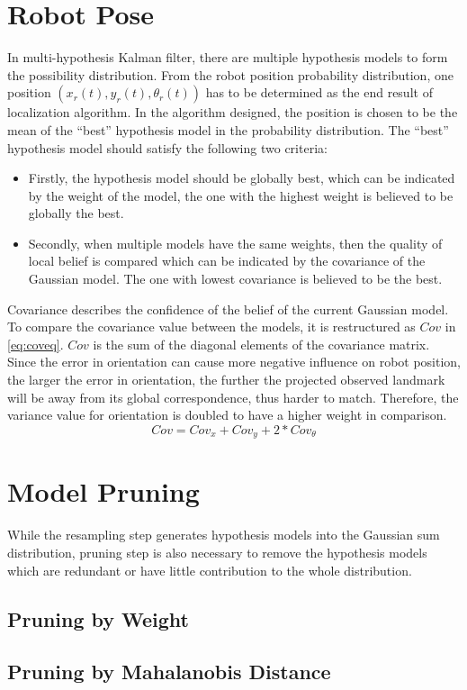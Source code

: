 \section{Robot Pose}
In multi-hypothesis Kalman filter, there are multiple hypothesis models to form the possibility distribution. From the robot position probability distribution, one position $(x_{r}(t), y_{r}(t),\theta_{r}(t))$
has to be determined as the end result of localization algorithm. In the algorithm designed, the position is chosen to be the mean of the ``best'' hypothesis model in the probability distribution. The  ``best'' hypothesis model should satisfy the following two criteria:
\begin{itemize}
  \item Firstly, the hypothesis model should be globally best, which can be indicated by the weight of the model, the one with the highest weight is believed to be globally the best.
   \item Secondly, when multiple models have the same weights, then the quality of local belief is compared which can be indicated by the covariance of the Gaussian model. The one with lowest covariance is believed to be the best.
\end{itemize}

Covariance describes the confidence of the belief of the current Gaussian model. To compare the covariance value between the models, it is restructured as $Cov$ in \autoref{eq:coveq}. $Cov$ is the sum of the diagonal elements of the covariance matrix. Since the error in orientation can cause more negative influence on robot position, \ie the larger the error in orientation, the further the projected observed landmark will be away from its global correspondence, thus harder to match. Therefore, the variance value for orientation is doubled to have a higher weight in comparison.
\begin{equation}
\label{eq:coveq}
Cov = Cov_x + Cov_y +2*Cov_{\theta}
\end{equation}

\section{Model Pruning}
While the resampling step generates hypothesis models into the Gaussian sum distribution, pruning step is also necessary to remove the hypothesis models which are redundant or have little contribution to the whole distribution.

\subsection{Pruning by Weight}
\label{sub:Pruning by Weight}

\subsection{Pruning by Mahalanobis Distance}
\label{sub:Pruning by Mahalanobis Distance}




